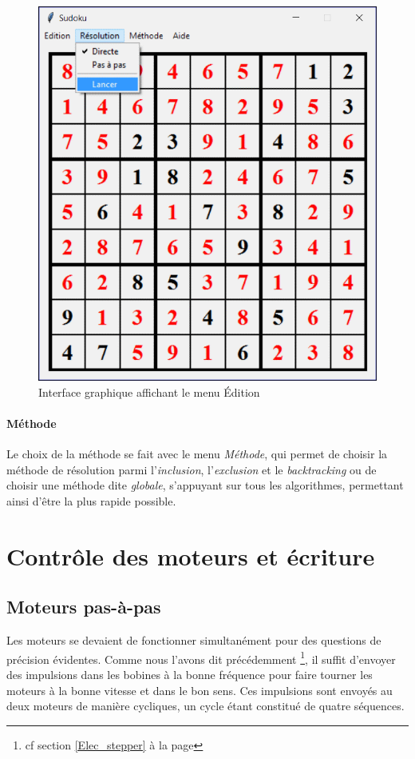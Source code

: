 \documentclass[12pt,a4paper]{report}
\begin{document}
\begin{figure}[!h]
 \center
 \includegraphics[scale=0.55]{../pictures/Sudoku_resolution}
 \caption{Interface graphique affichant le menu Édition}
\end{figure}

\paragraph{Méthode}Le choix de la méthode se fait avec le menu \emph{Méthode}, qui permet de choisir la méthode de résolution parmi l'\emph{inclusion}, l'\emph{exclusion} et le \emph{backtracking} ou de choisir une méthode dite \emph{globale}, s'appuyant sur tous les algorithmes, permettant ainsi d'être la plus rapide possible.

\section{Contrôle des moteurs et écriture}
\subsection*{Moteurs pas-à-pas}
Les moteurs se devaient de fonctionner simultanément pour des questions de précision évidentes. Comme nous l'avons dit précédemment \footnote{cf section \ref{Elec_stepper} à la page \pageref{Elec_stepper}}, il suffit d'envoyer des impulsions dans les bobines à la bonne fréquence pour faire tourner les moteurs à la bonne vitesse et dans le bon sens. Ces impulsions sont envoyés au deux moteurs de manière cycliques, un cycle étant constitué de quatre séquences.
\end{document}
